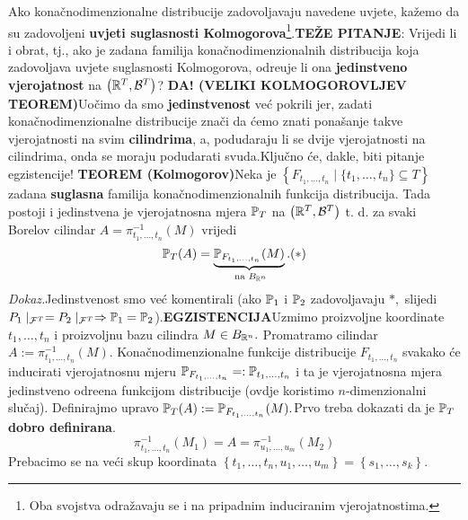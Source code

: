 \documentclass{article}
\begin{document}
Ako konačnodimenzionalne distribucije zadovoljavaju navedene uvjete, kažemo da su zadovoljeni \textbf{uvjeti suglasnosti Kolmogorova}\footnote[8]{Oba svojstva odražavaju se i na pripadnim induciranim vjerojatnostima.}.\newline\newline\textbf{TEŽE PITANJE}: Vrijedi li i obrat, tj., ako je zadana familija konačnodimenzionalnih distribucija koja zadovoljava uvjete suglasnosti Kolmogorova, odre\dj{}uje li ona \textbf{jedinstveno vjerojatnost} na \(\left(\Bbb R^T,\mathcal B^T\right)\)? \textbf{DA! (VELIKI KOLMOGOROVLJEV TEOREM)}\newline\newline Uočimo da smo \textbf{jedinstvenost} već pokrili jer, zadati konačnodimenzionalne distribucije znači da ćemo znati ponašanje takve vjerojatnosti na svim \textbf{cilindrima}, a, podudaraju li se dvije vjerojatnosti na cilindrima, onda se moraju podudarati svuda.\newline Ključno će, dakle, biti pitanje egzistencije!\newline\newline 
\textbf{TEOREM (Kolmogorov)}\newline Neka je \(\left\{F_{t_1,\ldots,t_n}\mid \{t_1,\ldots,t_n\}\subseteq T\right\}\) zadana \textbf{suglasna} familija konačnodimenzionalnih funkcija distribucija. Tada postoji i jedinstvena je vjerojatnosna mjera \(\Bbb P_T\) na \(\left(\Bbb R^T,\mathcal B^T\right)\) t. d. za svaki Borelov cilindar \(A=\pi_{t_1,\ldots,t_n}^{-1}(M)\) vrijedi \[\Bbb P_T(A)=\underbrace{\Bbb P_{F_{t_1,\ldots,t_n}}(M)}_{\text{ na }B_{\Bbb R^n}}.(*)\]
\textit{Dokaz.}\newline Jedinstvenost smo već komentirali (ako 
\(\Bbb P_1\) i \(\Bbb P_2\) zadovoljavaju \(*,\) slijedi \(P_1\mid_{\mathcal F^T}=P_2\mid_{\mathcal F^T}\Rightarrow\Bbb P_1=\Bbb P_2\)).\newline \textbf{EGZISTENCIJA}\newline Uzmimo proizvoljne koordinate \(t_1,\ldots,t_n\) i proizvoljnu bazu cilindra \(M\in B_{\Bbb R^n}.\) Promatramo cilindar \newline \(A:=\pi_{t_1,\ldots,t_n}^{-1}(M).\) Konačnodimenzionalne funkcije distribucije \(F_{t_1,\ldots,t_n}\) svakako će inducirati vjerojatnosnu mjeru \(\Bbb P_{F_{t_1,\ldots,t_n}}=:\Bbb P_{t_1,\ldots,t_n}\) i ta je vjerojatnosna mjera jedinstveno odre\dj{}ena funkcijom distribucije (ovdje koristimo \(n\)-dimenzionalni slučaj). Definirajmo upravo \(\Bbb P_T(A):=\Bbb P_{F_{t_1,\ldots,t_n}}(M).\)\newline Prvo treba dokazati da je \(\Bbb P_T\) \textbf{dobro definirana}. \[\pi_{t_1,\ldots,t_n}^{-1}(M_1)=A=\pi_{u_1,\ldots,u_m}^{-1}(M_2)\] Prebacimo se na veći skup koordinata \(\left\{t_1,\ldots,t_n,u_1,\ldots,u_m\right\}=\left\{s_1,\ldots,s_k\right\}.\)
\end{document}
